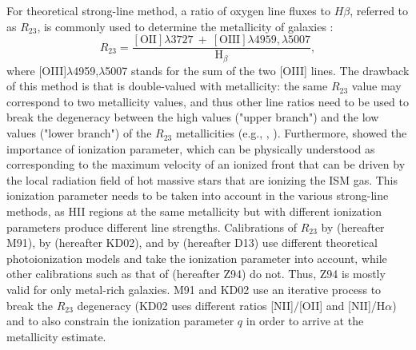 \documentclass{emulateapj}
\newcommand{\ha}{H$\alpha$}
\begin{document}
For theoretical strong-line method, a ratio of oxygen line fluxes to $H\beta$, referred to as $R_{23}$, is commonly used to determine the metallicity of galaxies  \citep{pagel79}:
$$R_{23}=\frac{\mathrm{[OII]} \lambda 3727~+~\mathrm{[OIII]} \lambda 4959,\lambda 5007}{\mathrm{H}_\beta},$$ 
where [OIII]$\lambda$4959,$\lambda$5007 stands for the sum of the two [OIII] lines.
The drawback of this method is that is double-valued with metallicity: the same $R_{23}$ value may correspond to two metallicity values, and thus other line ratios need to be used to break the degeneracy between the high values ("upper branch") and the low values ("lower branch") of the $R_{23}$ metallicities (e.g., \citealt{kewley08},  \citealt{moustakas10}). 
Furthermore, \citet{kewley02} showed the importance of ionization parameter, which can be physically understood as corresponding to the maximum velocity of an ionized front that can be driven by the local radiation field of hot massive stars that are ionizing the ISM gas. This ionization parameter needs to be taken into account in the various strong-line methods, as HII regions at the same metallicity but with different ionization parameters produce different line strengths. Calibrations of $R_{23}$ by \citet{mcgaugh91} (hereafter M91), by \citet{kewley02} (hereafter KD02), and by \citet{dopita13} (hereafter D13) use different theoretical photoionization models and take the ionization parameter into account, while other calibrations such as that of \citet{zaritsky94} (hereafter Z94) do not. Thus, Z94 is mostly valid for only metal-rich galaxies.  M91 and KD02 use an iterative process to break the $R_{23}$ degeneracy  (KD02 uses different ratios [NII]$/$[OII] and [NII]/\ha) and to also constrain the ionization parameter $q$ in order to arrive at the metallicity estimate.
\end{document}
